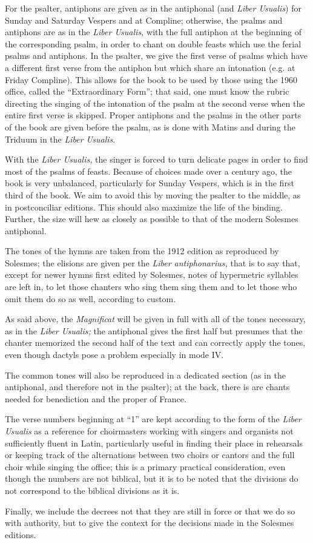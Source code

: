 \begin{enpars}
For the psalter, antiphons are given as in the antiphonal (and \textit{Liber Usualis}) for Sunday and Saturday Vespers and at Compline; otherwise, the psalms and antiphons are as in the \textit{Liber Usualis,} with the full antiphon at the beginning of the corresponding psalm, in order to chant on double feasts which use the ferial psalms and antiphons. In the psalter, we give the first verse of psalms which have a different first verse from the antiphon but which share an intonation (e.g. at Friday Compline). This allows for the book to be used by those using the 1960 office, called the ``Extraordinary Form''; that said, one must know the rubric directing the singing of the intonation of the psalm at the second verse when the entire first verse is skipped. Proper antiphons and the psalms in the other parts of the book are given before the psalm, as is done with Matins and during the Triduum in the \textit{Liber Usualis}.

With the \textit{Liber Usualis,} the singer is forced to turn delicate pages in order to find most of the psalms of feasts. Because of choices made over a century ago, the book is very unbalanced, particularly for Sunday Vespers, which is in the first third of the book. We aim to avoid this by moving the psalter to the middle, as in postconciliar editions. This should also maximize the life of the binding. Further, the size will hew as closely as possible to that of the modern Solesmes antiphonal.

The tones of the hymns are taken from the 1912 edition as reproduced by Solesmes; the elisions are given per the \textit{Liber antiphonarius,} that is to say that, except for newer hymns first edited by Solesmes, notes of hypermetric syllables are left in, to let those chanters who sing them sing them and to let those who omit them do so as well, according to custom.

As said above, the \textit{Magnificat} will be given in full with all of the tones necessary, as in the \textit{Liber Usualis;} the antiphonal gives the first half but presumes that the chanter memorized the second half of the text and can correctly apply the tones, even though dactyls pose a problem especially in mode IV.

The common tones will also be reproduced in a dedicated section (as in the antiphonal, and therefore not in the psalter); at the back, there is are chants needed for benediction and the proper of France.

The verse numbers beginning at ``1'' are kept according to the form of the \textit{Liber Usualis} as a reference for choirmasters working with singers and organists not sufficiently fluent in Latin, particularly useful in finding their place in rehearsals or keeping track of the alternations between two choirs or cantors and the full choir while singing the office; this is a primary practical consideration, even though the numbers are not biblical, but it is to be noted that the divisions do not correspond to the biblical divisions as it is.

Finally, we include the decrees not that they are still in force or that we do so with authority, but to give the context for the decisions made in the Solesmes editions.
\end{enpars}
